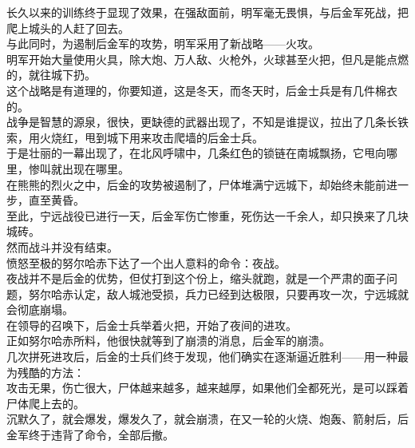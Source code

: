 \begin{multicols}{\theparacolNo}
长久以来的训练终于显现了效果，在强敌面前，明军毫无畏惧，与后金军死战，把爬上城头的人赶了回去。\\

与此同时，为遏制后金军的攻势，明军采用了新战略——火攻。\\

明军开始大量使用火具，除大炮、万人敌、火枪外，火球甚至火把，但凡是能点燃的，就往城下扔。\\

这个战略是有道理的，你要知道，这是冬天，而冬天时，后金士兵是有几件棉衣的。\\

战争是智慧的源泉，很快，更缺德的武器出现了，不知是谁提议，拉出了几条长铁索，用火烧红，甩到城下用来攻击爬墙的后金士兵。\\

于是壮丽的一幕出现了，在北风呼啸中，几条红色的锁链在南城飘扬，它甩向哪里，惨叫就出现在哪里。\\

在熊熊的烈火之中，后金的攻势被遏制了，尸体堆满宁远城下，却始终未能前进一步，直至黄昏。\\

至此，宁远战役已进行一天，后金军伤亡惨重，死伤达一千余人，却只换来了几块城砖。\\

然而战斗并没有结束。\\

愤怒至极的努尔哈赤下达了一个出人意料的命令：夜战。\\

夜战并不是后金的优势，但仗打到这个份上，缩头就跑，就是一个严肃的面子问题，努尔哈赤认定，敌人城池受损，兵力已经到达极限，只要再攻一次，宁远城就会彻底崩塌。\\

在领导的召唤下，后金士兵举着火把，开始了夜间的进攻。\\

正如努尔哈赤所料，他很快就等到了崩溃的消息，后金军的崩溃。\\

几次拼死进攻后，后金的士兵们终于发现，他们确实在逐渐逼近胜利——用一种最为残酷的方法：\\

攻击无果，伤亡很大，尸体越来越多，越来越厚，如果他们全都死光，是可以踩着尸体爬上去的。\\

沉默久了，就会爆发，爆发久了，就会崩溃，在又一轮的火烧、炮轰、箭射后，后金军终于违背了命令，全部后撤。\\


\end{multicols}
